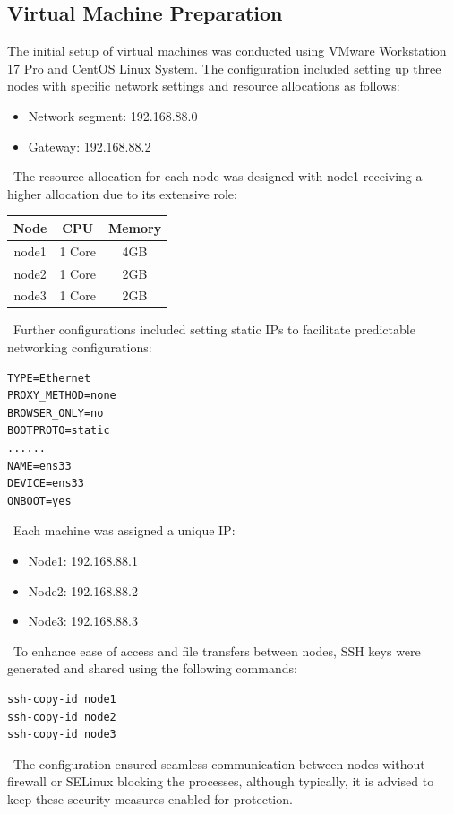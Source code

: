 \documentclass[12pt,a4paper]{article}
\begin{document}
\begin{multicols}{2}
\subsection{Virtual Machine Preparation}
The initial setup of virtual machines was conducted using VMware Workstation 17 Pro \cite{vmware1761player} and CentOS \cite{centos_download} Linux System. The configuration included setting up three nodes with specific network settings and resource allocations as follows:
\
\begin{itemize}
    \item Network segment: 192.168.88.0
    \item Gateway: 192.168.88.2
\end{itemize}
\
The resource allocation for each node was designed with node1 receiving a higher allocation due to its extensive role:
\
\begin{center}
    \begin{tabular}{|c|c|c|}
    \hline
    Node & CPU & Memory \\
    \hline
    node1 & 1 Core & 4GB \\
    node2 & 1 Core & 2GB \\
    node3 & 1 Core & 2GB \\
    \hline
    \end{tabular}
    \label{tab:vm_resources}
\end{center}
\
Further configurations included setting static IPs to facilitate predictable networking configurations:\
\begin{verbatim}
TYPE=Ethernet
PROXY_METHOD=none
BROWSER_ONLY=no
BOOTPROTO=static
......
NAME=ens33
DEVICE=ens33
ONBOOT=yes
\end{verbatim}
\
Each machine was assigned a unique IP:
\begin{itemize}
    \item Node1: 192.168.88.1
    \item Node2: 192.168.88.2
    \item Node3: 192.168.88.3
\end{itemize}
\
To enhance ease of access and file transfers between nodes, SSH keys were generated and shared using the following commands:
\begin{verbatim}
ssh-copy-id node1
ssh-copy-id node2
ssh-copy-id node3
\end{verbatim}
\
The configuration ensured seamless communication between nodes without firewall or SELinux blocking the processes, although typically, it is advised to keep these security measures enabled for protection.


\end{multicols}
\end{document}
